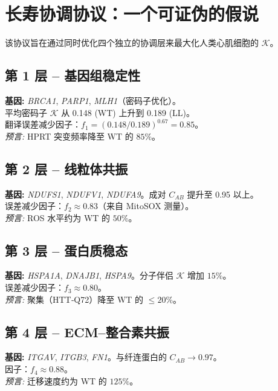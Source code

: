 \documentclass[12pt,a4paper]{article}
\newcommand{\REL}{\mathcal{K}}          %
\begin{document}
	\section{长寿协调协议：一个可证伪的假说}
	\label{sec:LL}
	该协议旨在通过同时优化四个独立的协调层来最大化人类心肌细胞的 \(\REL\)。
	
	\subsection{第 1 层 – 基因组稳定性}
	\textbf{基因:} \emph{BRCA1}, \emph{PARP1}, \emph{MLH1}（密码子优化）。\\
	平均密码子 \(\REL\) 从 0.148 (WT) 上升到 0.189 (LL)。\\
	翻译误差减少因子：\(f_1 = (0.148/0.189)^{0.67} = 0.85\)。\\
	\textit{预言:} HPRT 突变频率降至 WT 的 \(85\%\)。
	
	\subsection{第 2 层 – 线粒体共振}
	\textbf{基因:} \emph{NDUFS1}, \emph{NDUFV1}, \emph{NDUFA9}。成对 \(C_{AB}\) 提升至 0.95 以上。\\
	误差减少因子：\(f_2 \approx 0.83\)（来自 MitoSOX 测量）。\\
	\textit{预言:} ROS 水平约为 WT 的 \(50\%\)。
	
	\subsection{第 3 层 – 蛋白质稳态}
	\textbf{基因:} \emph{HSPA1A}, \emph{DNAJB1}, \emph{HSPA9}。分子伴侣 \(\REL\) 增加 \(15\%\)。\\
	误差减少因子：\(f_3 \approx 0.80\)。\\
	\textit{预言:} 聚集（HTT‑Q72）降至 WT 的 \(\le 20\%\)。
	
	\subsection{第 4 层 – ECM–整合素共振}
	\textbf{基因:} \emph{ITGAV}, \emph{ITGB3}, \emph{FN1}。与纤连蛋白的 \(C_{AB} \to 0.97\)。\\
	因子：\(f_4 \approx 0.88\)。\\
	\textit{预言:} 迁移速度约为 WT 的 \(125\%\)。
	
\end{document}
